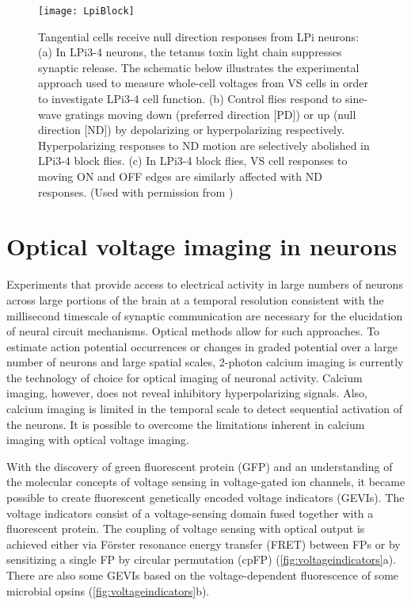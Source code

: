 \begin{figure}
\centering
\hspace*{-1cm} 
\texttt{[image: LpiBlock]}
\caption[Tangential cells receive null direction responses from LPi neurons] {Tangential cells receive null direction responses from LPi neurons: (a) In LPi3-4 neurons, the tetanus toxin light chain suppresses synaptic release. The schematic below illustrates the experimental approach used to measure whole-cell voltages from VS cells in order to investigate LPi3-4 cell function. (b) Control flies respond to sine-wave gratings moving down (preferred direction [PD]) or up (null direction [ND]) by depolarizing or hyperpolarizing respectively. Hyperpolarizing responses to ND motion are selectively abolished in LPi3-4 block flies. (c) In LPi3-4 block flies, VS cell responses to moving ON and OFF edges are similarly affected with ND responses. (Used with permission from \parencite{Mauss2015})} 
\label{fig:lpiblock}
\end{figure}

\section{Optical voltage imaging in neurons}
Experiments that provide access to electrical activity in large numbers of neurons across large portions of the brain at a temporal resolution consistent with the millisecond timescale of synaptic communication are necessary for the elucidation of neural circuit mechanisms. Optical methods allow for such approaches. To estimate action potential occurrences or changes in graded potential over a large number of neurons and large spatial scales, 2-photon calcium imaging is currently the technology of choice for optical imaging of neuronal activity. Calcium imaging, however, does not reveal inhibitory hyperpolarizing signals. Also, calcium imaging is limited in the temporal scale to detect sequential activation of the neurons. It is possible to overcome the limitations inherent in calcium imaging with optical voltage imaging.

With the discovery of green fluorescent protein (GFP) and an understanding of the molecular concepts of voltage sensing in voltage-gated ion channels, it became possible to create fluorescent genetically encoded voltage indicators (GEVIs). The voltage indicators consist of a voltage-sensing domain fused together with a fluorescent protein. The coupling of voltage sensing with optical output is achieved either via Förster resonance energy transfer (FRET) between FPs or by sensitizing a single FP by circular permutation (cpFP) (\ref{fig:voltageindicators}a). There are also some GEVIs based on the voltage-dependent fluorescence of some microbial opsins (\ref{fig:voltageindicators}b).

